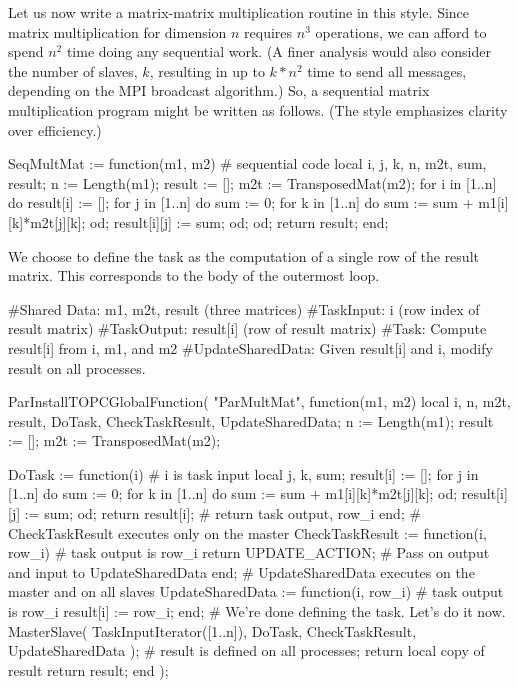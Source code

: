 
Let us now write a matrix-matrix
multiplication routine in this style.  Since matrix multiplication for
dimension $n$ requires $n^3$ operations, we can afford to spend $n^2$ time
doing any sequential work.  (A finer analysis would also consider the
number of slaves, $k$, resulting in up to $k*n^2$ time to send all
messages, depending on the MPI broadcast algorithm.)  So, a sequential
matrix multiplication program might be written as follows.  (The style
emphasizes clarity over efficiency.)

\beginexample
SeqMultMat := function(m1, m2)               # sequential code
  local i, j, k, n, m2t, sum, result;
  n := Length(m1);
  result := [];
  m2t := TransposedMat(m2);
  for i in [1..n] do
    result[i] := [];
    for j in [1..n] do
      sum := 0;
      for k in [1..n] do
        sum := sum + m1[i][k]*m2t[j][k];
      od;
      result[i][j] := sum;
    od;
  od;
  return result;
end;
\endexample

We choose to define the task as the computation of a single row of the
result matrix.  This corresponds to the body of the outermost loop.

\beginexample
#Shared Data: m1, m2t, result (three matrices)
#TaskInput:   i (row index of result matrix)
#TaskOutput:  result[i] (row of result matrix)
#Task:        Compute result[i] from i, m1, and m2
#UpdateSharedData:  Given result[i] and i, modify result on all processes.

ParInstallTOPCGlobalFunction( "ParMultMat", function(m1, m2)
  local i, n, m2t, result, DoTask, CheckTaskResult, UpdateSharedData;
  n := Length(m1);
  result := [];
  m2t := TransposedMat(m2);

  DoTask := function(i) # i is task input
    local j, k, sum;
    result[i] := [];
    for j in [1..n] do
      sum := 0;
      for k in [1..n] do
        sum := sum + m1[i][k]*m2t[j][k];
      od;
      result[i][j] := sum;
    od;
    return result[i]; # return task output, row_i
  end;
  # CheckTaskResult executes only on the master
  CheckTaskResult := function(i, row_i) # task output is row_i
    return UPDATE_ACTION; # Pass on output and input to UpdateSharedData
  end;
  # UpdateSharedData executes on the master and on all slaves
  UpdateSharedData := function(i, row_i) # task output is row_i
    result[i] := row_i;
  end;
  # We're done defining the task.  Let's do it now.
  MasterSlave( TaskInputIterator([1..n]), DoTask, CheckTaskResult,
               UpdateSharedData );
  # result is defined on all processes;  return local copy of result
  return result;
end );
\endexample

